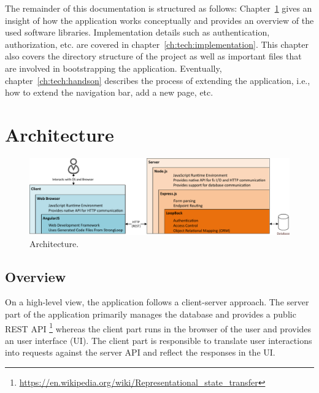 \documentclass[nochapterpage,nopartpage,noheadingspace,numbersubsubsec,bigchapter,colorback,accentcolor=tud9c,10pt]{tudreport}
\begin{document}
    The remainder of this documentation is structured as follows: Chapter~\ref{ch:tech:architecture} gives an insight of how the application works conceptually and provides an overview of the used software libraries. Implementation details such as authentication, authorization, etc. are covered in chapter~\ref{ch:tech:implementation}. This chapter also covers the directory structure of the project as well as important files that are involved in bootstrapping the application. Eventually, chapter~\ref{ch:tech:handson} describes the process of extending the application, i.e., how to extend the navigation bar, add a new page, etc.

  \chapter{Architecture}
  \label{ch:tech:architecture}

        \begin{figure}[!ht]
            \centering
            \includegraphics[width=\textwidth]{img/architecture-horizontal}
            \caption{Architecture.}
            \label{fig:tech:architecture}
        \end{figure}

  \section{Overview}
  \label{sec:tech:architecture:overview}
    On a high-level view, the application follows a client-server approach. The server part of the application primarily manages the database and provides a public REST API%
    \footnote{\url{https://en.wikipedia.org/wiki/Representational_state_transfer}}
    whereas the client part runs in the browser of the user and provides an user interface (UI). The client part is responsible to translate user interactions into requests against the server API and reflect the responses in the UI.
\end{document}

